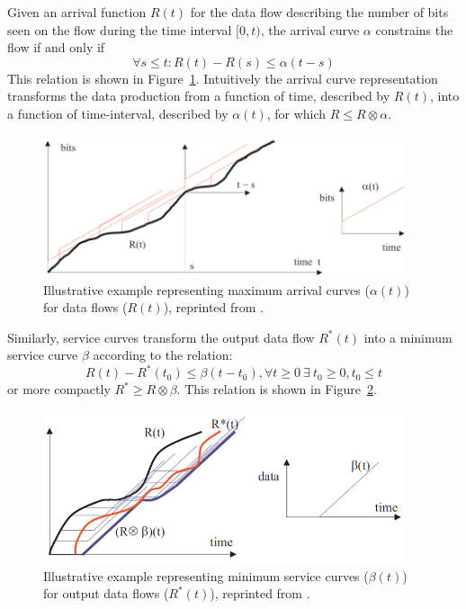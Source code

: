 Given an arrival function $R(t)$ for the data flow describing the
number of bits seen on the flow during the time interval $[0,t)$, the
arrival curve $\alpha$ constrains the flow if and only if
\begin{equation}
\forall s\leq t : R(t) -R(s) \leq \alpha(t-s)
\end{equation}
This relation is shown in Figure~\ref{fig:nc_arrival_curve}.
Intuitively the arrival curve representation transforms the data
production from a function of time, described by $R(t)$, into a
function of time-interval, described by $\alpha(t)$, for which $R\leq
R \otimes \alpha$.

\begin{figure}[htb]
	\centering
	\includegraphics[width=0.95\textwidth]{figs/nc_arrival_curve.png}
	\caption{Illustrative example representing maximum arrival curves ($\alpha(t)$) for data flows ($R(t)$), reprinted from \cite{NCBook}.}
	\label{fig:nc_arrival_curve}
\end{figure}

Similarly, service curves transform the output data flow $R^*(t)$ into a minimum service curve $\beta$ according to the relation:
\begin{equation}
R(t)-R^*(t_0)\leq \beta(t-t_0), \forall t\geq 0\ \exists\  t_0\geq 0,t_0\leq t
\end{equation}
or more compactly $R^*\geq R\otimes\beta$.  This relation is shown in Figure~\ref{fig:nc_service_curve}.

\begin{figure}[htb]
	\centering
	\includegraphics[width=0.95\textwidth]{figs/nc_service_curve.png}
	\caption{Illustrative example representing minimum service curves ($\beta(t)$) for output data flows ($R^*(t)$), reprinted from \cite{NCBook}.}
	\label{fig:nc_service_curve}
\end{figure}

